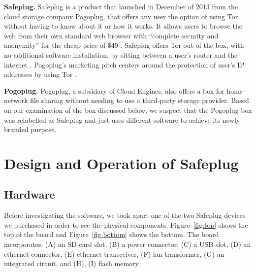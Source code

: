 \documentclass[conference]{IEEEtran}
\begin{document}
{\bf Safeplug.} Safeplug is a product that launched in December of 2013 from the cloud storage company Pogoplug, that offers any user the option of using Tor without having to know about it or how it works.  It allows users to browse the web from their own standard web browser with “complete security and anonymity” for the cheap price of \$49 \cite{safeplug}.  Safeplug offers Tor out of the box, with no additional software installation, by sitting between a user's router and the internet \cite{wired}.  Pogoplug’s marketing pitch centers around the protection of user’s IP addresses by using Tor \cite{safeplug,bittech}.

{\bf Pogoplug.} Pogoplug, a subsidary of Cloud Engines, also offers a box for home network file sharing without needing to use a third-party storage provider.  Based on our examination of the box discussed below, we suspect that the Pogoplug box was relabelled as Safeplug and just uses different software to achieve its newly branded purpose.

\section{Design and Operation of Safeplug}
\subsection{Hardware}
Before investigating the software, we took apart one of the two Safeplug devices we purchased in order to see the physical components.  Figure~\ref{fig:top} shows the top of the board and Figure~\ref{fig:bottom} shows the bottom.  The board incorporates: (A) an SD card slot, (B) a power connector, (C) a USB slot, (D) an ethernet connector, (E) ethernet transceiver, (F) lan transformer, (G) an integrated circuit, and (H), (I) flash memory.

\end{document}
